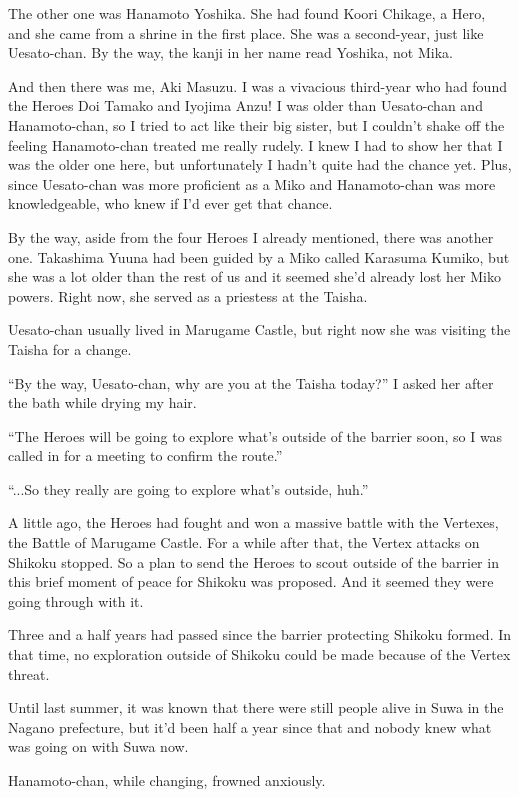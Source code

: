 The other one was Hanamoto Yoshika. She had found Koori Chikage, a Hero, and she came from a shrine in the first place. She was a second-year, just like Uesato-chan. By the way, the kanji in her name read Yoshika, not Mika.

And then there was me, Aki Masuzu. I was a vivacious third-year who had found the Heroes Doi Tamako and Iyojima Anzu! I was older than Uesato-chan and Hanamoto-chan, so I tried to act like their big sister, but I couldn't shake off the feeling Hanamoto-chan treated me really rudely. I knew I had to show her that I was the older one here, but unfortunately I hadn't quite had the chance yet. Plus, since Uesato-chan was more proficient as a Miko and Hanamoto-chan was more knowledgeable, who knew if I'd ever get that chance.

By the way, aside from the four Heroes I already mentioned, there was another one. Takashima Yuuna had been guided by a Miko called Karasuma Kumiko, but she was a lot older than the rest of us and it seemed she'd already lost her Miko powers. Right now, she served as a priestess at the Taisha.

Uesato-chan usually lived in Marugame Castle, but right now she was visiting the Taisha for a change.

``By the way, Uesato-chan, why are you at the Taisha today?'' I asked her after the bath while drying my hair.

``The Heroes will be going to explore what's outside of the barrier soon, so I was called in for a meeting to confirm the route.''

``...So they really are going to explore what's outside, huh.''

A little ago, the Heroes had fought and won a massive battle with the Vertexes, the Battle of Marugame Castle. For a while after that, the Vertex attacks on Shikoku stopped. So a plan to send the Heroes to scout outside of the barrier in this brief moment of peace for Shikoku was proposed. And it seemed they were going through with it.

Three and a half years had passed since the barrier protecting Shikoku formed. In that time, no exploration outside of Shikoku could be made because of the Vertex threat.

Until last summer, it was known that there were still people alive in Suwa in the Nagano prefecture, but it'd been half a year since that and nobody knew what was going on with Suwa now.

Hanamoto-chan, while changing, frowned anxiously.

